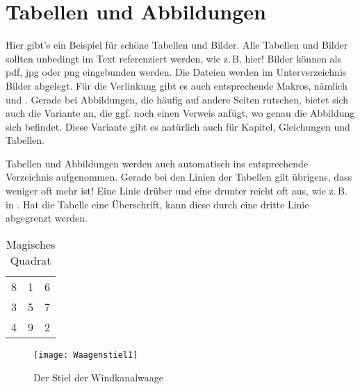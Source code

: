 \section{Tabellen und Abbildungen}
\label{sec:TabellenUndAbbildungen}

Hier gibt's ein Beispiel für schöne Tabellen und Bilder.
Alle Tabellen und Bilder sollten unbedingt im Text referenziert werden, wie z.\,B.  hier!
Bilder können als pdf, jpg oder png eingebunden werden.
Die Dateien werden im Unterverzeichnis Bilder abgelegt.
Für die Verlinkung gibt es auch entsprechende Makros, nämlich  und .
Gerade bei Abbildungen, die häufig auf andere Seiten rutschen, bietet sich auch die Variante  an, die ggf. noch einen Verweis anfügt, wo genau die Abbildung sich befindet. 
Diese Variante gibt es natürlich auch für Kapitel, Gleichungen und Tabellen.

Tabellen und Abbildungen werden auch automatisch ins entsprechende Verzeichnis aufgenommen.
Gerade bei den Linien der Tabellen gilt übrigens, dass weniger oft mehr ist!
Eine Linie drüber und eine drunter reicht oft aus, wie z.\,B. in  .
Hat die Tabelle eine Überschrift, kann diese durch eine dritte Linie abgegrenzt werden.

\begin{table}[htbp]
	\centering	
	\begin{tabular}{ccc} %
		\hline 
		8 & 1 & 6 \\
  	3 & 5 & 7 \\
  	4 & 9 & 2 \\
		\hline
	\end{tabular}
	\caption{Magisches Quadrat} %
	\label{tab:MagischesQuadrat}
\end{table}

\begin{figure}[htbp]
	\centering
		\texttt{[image: Waagenstiel1]}
	\caption{Der Stiel der Windkanalwaage}
	\label{fig:Waagenstiel1}
\end{figure}

